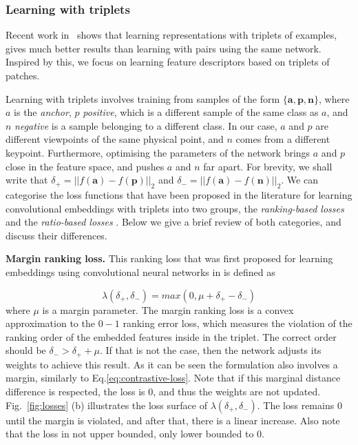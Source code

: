\subsubsection{Learning with triplets}
Recent work in~\cite{DBLP:journals/corr/HofferA14}
shows that learning representations with triplets of examples, gives much better results than
learning with pairs using the same network. Inspired by this, we  focus on learning feature descriptors based on triplets of  patches.

Learning with triplets involves training from samples of the form
$\{\boldsymbol a,\boldsymbol p,\boldsymbol n \}$, where $a$ is the
\textit{anchor}, $p$ \textit{positive}, which is a different sample of the
same class as $a$, and $n$ \textit{negative} is a sample
belonging to a different class. In our case, $a$ and $p$ are different
viewpoints of the same physical point, and $n$ comes from
a different keypoint. Furthermore, optimising the parameters of the
network  brings $a$ and $p$ close in the feature space, and pushes $a$ and $n$ far apart.  For
brevity, we shall write that
$\delta_{+} = ||f(\boldsymbol a)-f(\boldsymbol p)||_2$ and
$\delta_{-} = ||f(\boldsymbol a)-f(\boldsymbol n)||_2$. We can
categorise the loss functions that have been proposed in the
literature for learning convolutional embeddings with triplets into
two groups, the {\em ranking-based losses} and the {\em ratio-based
  losses}
\cite{wohlhart15,DBLP:journals/corr/HofferA14,DBLP:journals/corr/WangSLRWPCW14}. Below
we give a brief review of both categories, and  discuss their
differences.

\textbf{Margin ranking loss.}
This ranking loss that was first proposed for learning embeddings using
convolutional neural networks in
\cite{DBLP:journals/corr/WangSLRWPCW14} is defined as
 
\begin{equation}
  \label{eq:triplet-margin}
  \lambda(\delta_+,\delta_-) = max(0, \mu
		+\delta_+-\delta_-) 
\end{equation}
where $\mu$ is a margin parameter.  The margin ranking loss is a
convex approximation to the $0-1$ ranking error loss, which measures
the violation of the ranking order of the embedded features inside in
the triplet. The correct order should be
$\delta_{-} > \delta_{+} + \mu$. If that is not the case, then the
network adjusts its weights to achieve this result. As it can be seen
the formulation also involves a margin, similarly to
Eq.\eqref{eq:contrastive-loss}. Note that if this marginal distance
difference is respected, the loss is 0, and thus the weights are not
updated. Fig.~\ref{fig:losses} (b) illustrates the loss surface of
$\lambda(\delta_+,\delta_-)$. The loss remains 0 until the margin is
violated, and after that, there is a linear increase. Also note that
the loss in not upper bounded, only lower bounded to 0.

